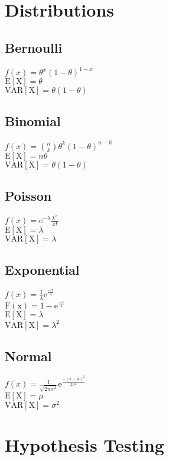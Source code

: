 \documentclass{article}
\begin{document}
\section{Distributions}

\subsection{Bernoulli}

$f(x)=\theta^x(1-\theta)^{1-x}$\\
$\mathrm{E[X]}=\theta$\\
$\mathrm{VAR[X]}=\theta(1-\theta)$

\subsection{Binomial}

$f(x)=\binom{n}{k}\theta^k(1-\theta)^{n-k}$\\
$\mathrm{E[X]}=n\theta$\\
$\mathrm{VAR[X]}=\theta(1-\theta)$

\subsection{Poisson}
$f(x)=\mathrm{e}^{-\lambda}\frac{\lambda^x}{x!}$\\
$\mathrm{E[X]}=\lambda$\\
$\mathrm{VAR[X]}=\lambda$

\subsection{Exponential}
$f(x)=\frac{1}{\lambda}\mathrm{e}^{\frac{-x}{\lambda}}$\\
$\mathrm{F(x)}=1-\mathrm{e}^{\frac{-x}{\lambda}}$\\
$\mathrm{E[X]}=\lambda$\\
$\mathrm{VAR[X]}=\lambda^2$

\subsection{Normal}
$f(x)=\frac{1}{\sqrt{2\pi\sigma^2}}\mathrm{e}^{\frac{-(x-\mu)^2}{2\sigma^2}}$\\
$\mathrm{E[X]}=\mu$\\
$\mathrm{VAR[X]}=\sigma^2$

\section{Hypothesis Testing}
\end{document}
